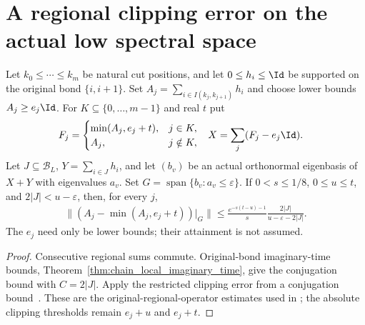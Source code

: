 \section{A regional clipping error on the actual low spectral space}

\begin{lemma}
    \label{thm:consecutive_regional_truncation_low}
    \leanok
    Let $k_0\le\cdots\le k_m$ be natural cut positions, and let
    $0\le h_i\le\Id$ be supported on the original bond $\{i,i+1\}$.
    Set $A_j=\sum_{i\in I(k_j,k_{j+1})}h_i$ and choose lower bounds
    $A_j\ge e_j\Id$. For $K\subseteq\{0,\ldots,m-1\}$ and real $t$ put
    \begin{align}
        F_j & =\begin{cases}\min(A_j,e_j+t),&j\in K,\\A_j,&j\notin K,\end{cases} & X & =\sum_j(F_j-e_j\Id).
    \end{align}
    Let $J\subseteq\mathcal B_L$, $Y=\sum_{i\in J}h_i$, and let $(b_v)$
    be an actual orthonormal eigenbasis of $X+Y$ with eigenvalues $a_v$.
    Set $G=\operatorname{span}\{b_v:a_v\le\varepsilon\}$.
    If $0<s\le1/8$, $0\le u\le t$, and $2|J|<u-\varepsilon$, then,
    for every $j$,
    \begin{align}
        \bigl\|(A_j-\min(A_j,e_j+t))|_G\bigr\|
        \le\frac{e^{-s(t-u)-1}}{s}
        \frac{2|J|}{u-\varepsilon-2|J|}.
    \end{align}
    The $e_j$ need only be lower bounds; their attainment is not assumed.
\end{lemma}
\begin{proof}
    \leanok
    Consecutive regional sums commute. Original-bond imaginary-time bounds,
    Theorem~\ref{thm:chain_local_imaginary_time}, give the conjugation bound
    with $C=2|J|$. Apply the restricted clipping error from a conjugation
    bound~\cite[``Restricted clipping error from a conjugation bound'']{QICLean2026Blueprint}.
    These are the original-regional-operator estimates used in
    \cite[lines 909--960]{Arad2016RigorousRG}; the absolute clipping thresholds
    remain $e_j+u$ and $e_j+t$.
\end{proof}
